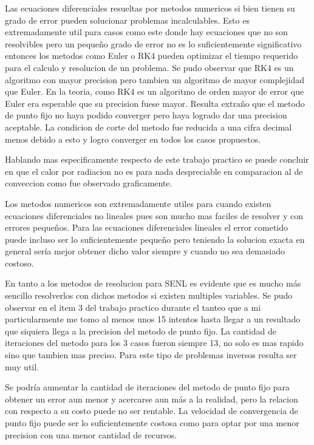\documentclass[11pt,a4paper]{article}
\begin{document}
Las ecuaciones diferenciales resueltas por metodos numericos si bien tienen su grado de error pueden solucionar problemas incalculables. Esto es extremadamente util para casos como este donde hay ecuaciones que no son resolvibles pero un pequeño grado de error no es lo suficientemente significativo entonces los metodos como Euler o RK4 pueden optimizar el tiempo requerido para el calculo y resolucion de un problema. Se pudo observar que RK4 es un algoritmo con mayor precision pero tambien un algoritmo de mayor complejidad que Euler. En la teoria, como RK4 es un algoritmo de orden mayor de error que Euler era esperable que su precision fuese mayor. Resulta extraño que el metodo de punto fijo no haya podido converger pero haya logrado dar una precision aceptable. La condicion de corte del metodo fue reducida a una cifra decimal menos debido a esto y logro converger en todos los casos propuestos.

Hablando mas especificamente respecto de este trabajo practico se puede concluir en que el calor por radiacion no es para nada despreciable en comparacion al de conveccion como fue observado graficamente.

Los metodos numericos son extremadamente utiles para cuando existen ecuaciones diferenciales no lineales pues son mucho mas faciles de resolver y con errores pequeños. Para las ecuaciones diferenciales lineales el error cometido puede incluso ser lo suficientemente pequeño pero teniendo la solucion exacta en general sería mejor obtener dicho valor siempre y cuando no sea demasiado costoso.

En tanto a los metodos de resolucion para SENL es evidente que es mucho más sencillo resolverlos con dichos metodos si existen multiples variables. Se pudo observar en el item 3 del trabajo practico durante el tanteo que a mi particularmente me tomo al menos unos 15 intentos hasta llegar a un resultado que siquiera llega a la precision del metodo de punto fijo. La cantidad de iteraciones del metodo para los 3 casos fueron siempre 13, no solo es mas rapido sino que tambien mas preciso. Para este tipo de problemas inversos resulta ser muy util.

Se podría aumentar la cantidad de iteraciones del metodo de punto fijo para obtener un error aun menor y acercarse aun más a la realidad, pero la relacion con respecto a su costo puede no ser rentable. La velocidad de convergencia de punto fijo puede ser lo suficientemente costosa como para optar por una menor precision con una menor cantidad de recursos.
\end{document}
